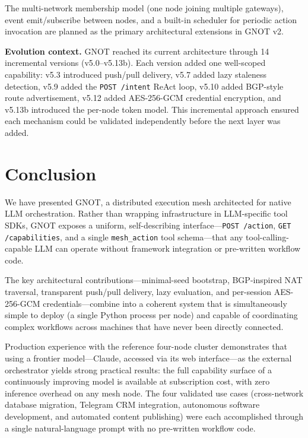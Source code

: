 \documentclass[10pt,twocolumn]{article}
\begin{document}
The multi-network membership model (one node joining multiple gateways),
event emit/subscribe between nodes, and a built-in scheduler for
periodic action invocation are planned as the primary architectural
extensions in GNOT v2.

\textbf{Evolution context.} GNOT reached its current architecture
through 14 incremental versions (v5.0--v5.13b). Each version added
one well-scoped capability: v5.3 introduced push/pull delivery, v5.7
added lazy staleness detection, v5.9 added the \texttt{POST /intent}
ReAct loop, v5.10 added BGP-style route advertisement, v5.12 added
AES-256-GCM credential encryption, and v5.13b introduced the per-node
token model. This incremental approach ensured each mechanism could be
validated independently before the next layer was added.

\FloatBarrier
\section{Conclusion}
\label{sec:conclusion}

We have presented GNOT, a distributed execution mesh architected for
native LLM orchestration. Rather than wrapping infrastructure in
LLM-specific tool SDKs, GNOT exposes a uniform, self-describing
interface---\texttt{POST /action}, \texttt{GET /capabilities}, and a
single \texttt{mesh\_action} tool schema---that any tool-calling-capable
LLM can operate without framework integration or pre-written workflow
code.

The key architectural contributions---minimal-seed bootstrap,
BGP-inspired NAT traversal, transparent push/pull delivery, lazy
evaluation, and per-session AES-256-GCM credentials---combine into a
coherent system that is simultaneously simple to deploy (a single Python
process per node) and capable of coordinating complex workflows across
machines that have never been directly connected.

Production experience with the reference four-node cluster demonstrates
that using a frontier model---Claude, accessed via its web
interface---as the external orchestrator yields strong practical results:
the full capability surface of a continuously improving model is
available at subscription cost, with zero inference overhead on any mesh
node. The four validated use cases (cross-network database migration,
Telegram CRM integration, autonomous software development, and automated
content publishing) were each accomplished through a single
natural-language prompt with no pre-written workflow code.
\end{document}
